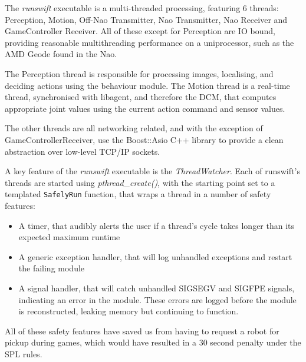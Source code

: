 \documentclass[pdftex,11pt,a4paper]{report}
\begin{document}
The \emph{runswift} executable is a multi-threaded processing, featuring 6 threads: Perception, Motion, Off-Nao Transmitter, Nao Transmitter, Nao Receiver and GameController Receiver. All of these except for Perception are IO bound, providing reasonable multithreading performance on a uniprocessor, such as the AMD Geode found in the Nao.

The Perception thread is responsible for processing images, localising, and deciding actions using the behaviour module. The Motion thread is a real-time thread, synchronised with libagent, and therefore the DCM, that computes appropriate joint values using the current action command and sensor values.

The other threads are all networking related, and with the exception of GameControllerReceiver, use the Boost::Asio C++ library to provide a clean abstraction over low-level TCP/IP sockets.


A key feature of the \emph{runswift} executable is the \emph{ThreadWatcher}. Each of runswift's threads are started using \emph{pthread\_create()}, with the starting point set to a templated \texttt{SafelyRun} function, that wraps a thread in a number of safety features:\begin{itemize}
\item{A timer, that audibly alerts the user if a thread's cycle takes longer than its expected maximum runtime}
\item{A generic exception handler, that will log unhandled exceptions and restart the failing module}
\item{A signal handler, that will catch unhandled SIGSEGV and SIGFPE signals, indicating an error in the module. These errors are logged before the module is reconstructed, leaking memory but continuing to function.}
\end{itemize}
All of these safety features have saved us from having to request a robot for pickup during games, which would have resulted in a 30 second penalty under the SPL rules.
\end{document}
